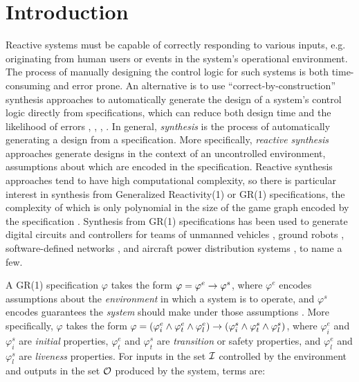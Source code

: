 \documentclass[runningheads]{llncs}
\begin{document}
\section{Introduction}

Reactive systems must be capable of correctly responding to various inputs, 
e.g. originating from human users or events in the system's operational environment. 
The process of manually designing the control logic for such systems is both time-consuming and error prone. 
An alternative is to use ``correct-by-construction'' synthesis approaches to automatically generate 
the design of a system's control logic directly from specifications, which can 
reduce both design time and the likelihood of errors 
\cite{alur2016compositional}, \cite{fainekos2009temporal}, \cite{guo2014cooperative}, \cite{kupermann2001synthesizing}. 
In general, \emph{synthesis} is the process of automatically generating a design from a specification. 
More specifically, \emph{reactive synthesis} approaches generate designs in the context of an uncontrolled environment, 
assumptions about which are encoded in the specification.
Reactive synthesis approaches tend to have high computational complexity,  
so there is particular interest in synthesis from Generalized Reactivity(1) or GR(1) specifications, 
the complexity of which is only polynomial in the size of the game graph encoded by the specification \cite{bloem2012}.
Synthesis from GR(1) specifications has been used to generate digital circuits \cite{ehlers2012symbolically} 
and controllers for teams of unmanned vehicles \cite{apker2016}, ground robots \cite{kress2007s}, 
software-defined networks \cite{wang2013automated}, and aircraft power distribution systems \cite{xu2012case}, to name a few.

A GR(1) specification $\varphi$ takes the form $\varphi = \varphi^e \rightarrow \varphi^s$, 
where $\varphi^e$ encodes assumptions about the \emph{environment} in which a system is to operate,
and $\varphi^s$ encodes guarantees the \emph{system} should make under those assumptions \cite{Ehlers2016}. 
More specifically, $\varphi$ takes the form 
$\varphi = (\varphi^e_i \land \varphi^e_t \land \varphi^e_l)  \rightarrow (\varphi^s_i \land \varphi^s_t \land \varphi^s_l)$,
where $\varphi^e_i$ and $\varphi^s_i$ are \emph{initial} properties, 
$\varphi^e_t$ and $\varphi^s_t$ are \emph{transition} or safety properties, and 
$\varphi^e_l$ and $\varphi^s_l$ are \emph{liveness} properties. 
For inputs in the set $\mathcal{I}$ controlled by the environment 
and outputs in the set $\mathcal{O}$ produced by the system, terms are:
\end{document}
